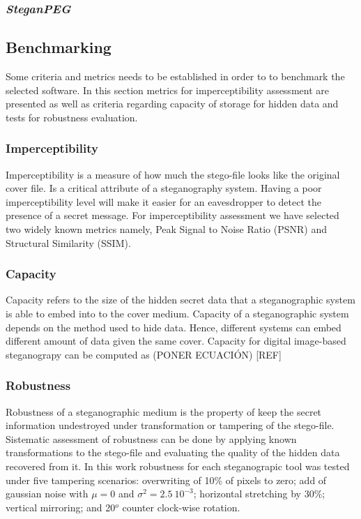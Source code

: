 \documentclass[11pt]{article}
\begin{document}
\subsubsection{\textit{SteganPEG}}

\subsection{Benchmarking}

Some criteria and metrics needs to be established in order to to benchmark the selected software.
In this section metrics for imperceptibility assessment are presented as well as criteria regarding capacity of storage for
hidden data and tests for robustness evaluation.

\subsubsection{Imperceptibility}

Imperceptibility is a measure of how much the stego-file
looks like the original cover file. Is a critical attribute of a steganography system. Having a poor imperceptibility level will make it 
easier for an eavesdropper to detect the presence of a secret message. For imperceptibility assessment we have selected
two widely known metrics namely, Peak Signal to Noise Ratio (PSNR) and Structural Similarity (SSIM).

\subsubsection{Capacity}

Capacity refers to the size of the hidden secret data that a steganographic system is able to embed into to the cover
medium. Capacity of a steganographic system depends on the method used to hide data. Hence, different systems can embed
different amount of data given the same cover. Capacity for digital image-based steganograpy can be computed as 
(PONER ECUACIÓN) [REF]


\subsubsection{Robustness}
\label{Subsubsec:Robustness}

Robustness of a steganographic medium is the property of keep the secret information undestroyed under transformation or 
tampering of the stego-file. Sistematic assessment of robustness can be done by applying known transformations to the stego-file
and evaluating the quality of the hidden data recovered from it. In this work robustness for each steganograpic tool 
was tested under five tampering scenarios: overwriting of 10\% of pixels to zero; add of gaussian noise with $\mu = 0$ and $\sigma^2 = 2.5\ 10^{-3}$; horizontal
stretching by 30\%; vertical mirroring; and 20$^o$ counter clock-wise rotation.
\end{document}
